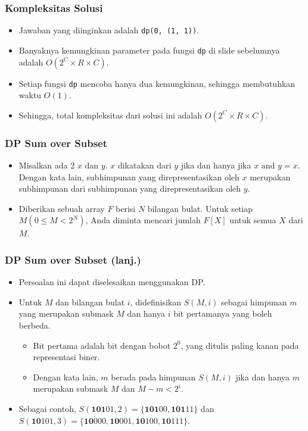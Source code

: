 \begin{frame}
\frametitle{Kompleksitas Solusi}
\begin{itemize}
  \item Jawaban yang diinginkan adalah \lstinline{dp(0, (1, 1))}.
  \item Banyaknya kemungkinan parameter pada fungsi \lstinline{dp} di slide sebelumnya adalah $O(2^C \times R \times C)$.
  \item Setiap fungsi \lstinline{dp} mencoba hanya dua kemungkinan, sehingga membutuhkan waktu $O(1)$.
  \item Sehingga, total kompleksitas dari solusi \fdp ini adalah $O(2^C \times R \times C)$.
\end{itemize}
\end{frame}

\begin{frame}
\frametitle{DP Sum over Subset}
\begin{itemize}
  \item Misalkan ada 2 \fbitmask $x$ dan $y$. $x$ dikatakan  dari $y$ jika dan hanya jika $x \text{ and } y = x$. Dengan kata lain, subhimpunan yang direpresentasikan oleh \fbitmask $x$ merupakan subhimpunan dari subhimpunan yang direpresentasikan oleh \fbitmask $y$.
  \item Diberikan sebuah array $F$ berisi $N$ bilangan bulat. Untuk setiap \fbitmask $M (0 \le M < 2^N)$, Anda diminta mencari jumlah $F[X]$ untuk semua $X$ \fsubmask dari $M$.
\end{itemize}
\end{frame}

\begin{frame}
\frametitle{DP Sum over Subset (lanj.)}
\begin{itemize}
  \item Persoalan ini dapat diselesaikan menggunakan DP.
  \item Untuk \fbitmask $M$ dan bilangan bulat $i$, didefinisikan $S(M, i)$ sebagai himpunan \fbitmask $m$ yang merupakan submask $M$ dan hanya $i$ bit pertamanya yang boleh berbeda.
  \begin{itemize}
    \item Bit pertama adalah bit dengan bobot $2^0$, yang ditulis paling kanan pada representasi biner.
    \item Dengan kata lain, $m$ berada pada himpunan $S(M, i)$ jika dan hanya $m$ merupakan submask $M$ dan $M - m < 2^i$.
  \end{itemize}
  \item Sebagai contoh, $S(\textbf{101}01, 2) = \{\textbf{101}00, \textbf{101}11\}$ dan $S(\textbf{10}101, 3) = \{\textbf{10}000, \textbf{10}001, \textbf{10}100, \textbf{10}111\}$.
\end{itemize}
\end{frame}


